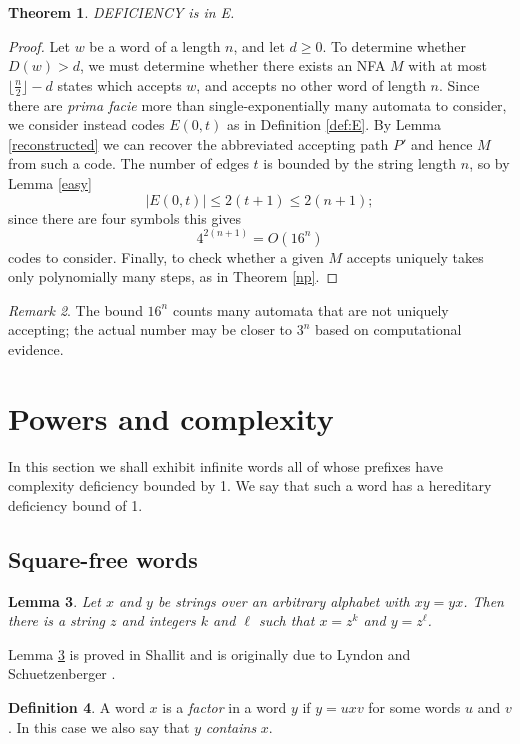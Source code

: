 \documentclass[12pt]{article}
\newcommand{\Squarefree}{Square-free}
\newcommand{\abs}[1]{\lvert#1\rvert}
\theoremstyle{plain}
\newtheorem{thm}{Theorem}
\newtheorem{lem}[thm]{Lemma}
\theoremstyle{definition}
\newtheorem{df}[thm]{Definition}
\theoremstyle{remark}
\newtheorem{rem}[thm]{Remark}
\begin{document}
			\begin{thm}\label{singly}
	 			\textsc{DEFICIENCY} is in E.
			\end{thm}
			\begin{proof}
				Let $w$ be a word of a length $n$, and let $d\ge 0$. To determine whether $D(w)>d$,
				we must determine whether there exists an NFA $M$ with at most $\lfloor\frac{n}{2}\rfloor - d$ states
				which accepts $w$, and accepts no other word of length $n$.
				Since there are \emph{prima facie} more than single-exponentially many automata to consider,
				we consider instead codes $E(0,t)$ as in Definition \ref{def:E}.
				By Lemma \ref{reconstructed} we can recover the abbreviated accepting path $P'$ and hence $M$ from such a code.
				The number of edges $t$ is bounded by the string length $n$, so by Lemma \ref{easy}
				\[
					\abs{E(0,t)}\le 2(t+1) \le 2(n+1);
				\]
				since there are four symbols this gives
				\[
					4^{2(n+1)}=O(16^n)
				\]
				codes to consider.
				Finally, to check whether a given $M$ accepts uniquely takes only polynomially many steps, as in Theorem \ref{np}.
			\end{proof}
			\begin{rem}
				The bound $16^n$ counts many automata that are not uniquely accepting; the actual number may be closer to $3^n$ based on
				computational evidence.
			\end{rem}

	\section{Powers and complexity}
		In this section we shall exhibit infinite words all of whose prefixes have complexity deficiency bounded by 1.
		We say that such a word has a hereditary deficiency bound of 1.
		\subsection{{\Squarefree} words}
			\begin{lem}\label{lyndon:schuetzenberger}
				Let $x$ and $y$ be strings over an arbitrary alphabet with $xy = yx$.
				Then there is a string $z$ and integers $k$ and $\ell$ such that $x = z^k$ and $y = z^\ell$.
			\end{lem}
			Lemma \ref{lyndon:schuetzenberger} is proved in Shallit \cite[Theorem 2.3.3]{Shallit:2008:SCF:1434864}
			and is originally due to Lyndon and Schuetzenberger \cite{MR0162838}.
			\begin{df}\label{factor}
				A word $x$ is a \emph{factor} in a word $y$ if $y=uxv$ for some words $u$ and $v$.
				In this case we also say that $y$ \emph{contains} $x$.
			\end{df}
\end{document}

